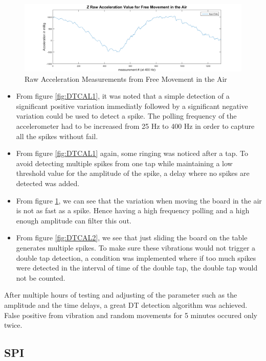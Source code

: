 \documentclass[12pt]{article}
\begin{document}
\begin{figure}[!htb]
 \centering
 \includegraphics[scale=0.45]{images/DTcalibration3.png}
 \caption{Raw Acceleration Measurements from Free Movement in the Air}
 \label{fig:DTCAL3}
\end{figure}

\begin{itemize}
\item From figure \ref{fig:DTCAL1}, it was noted that a simple detection of a significant positive variation immediatly followed by a significant negative variation could be used to detect a spike. The polling frequency of the accelerometer had to be increased from 25 Hz to 400 Hz in order to capture all the spikes without fail.
\item From figure \ref{fig:DTCAL1} again, some ringing was noticed after a tap. To avoid detecting multiple spikes from one tap while maintaining a low threshold value for the amplitude of the spike, a delay where no spikes are detected was added. 
\item From figure \ref{fig:DTCAL3}, we can see that the variation when moving the board in the air is not as fast as a spike. Hence having a high frequency polling and a high enough amplitude can filter this out. 
\item From figure \ref{fig:DTCAL2}, we see that just sliding the board on the table generates multiple spikes. To make sure these vibrations would not trigger a double tap detection, a condition was implemented where if too much spikes were detected in the interval of time of the double tap, the double tap would not be counted.
\end{itemize}
After multiple hours of testing and adjusting of the parameter such as the amplitude and the time delays, a great DT detection algorithm was achieved. False positive from vibration and random movements for 5 minutes occured only twice.
 
\subsection{SPI}
\end{document}
